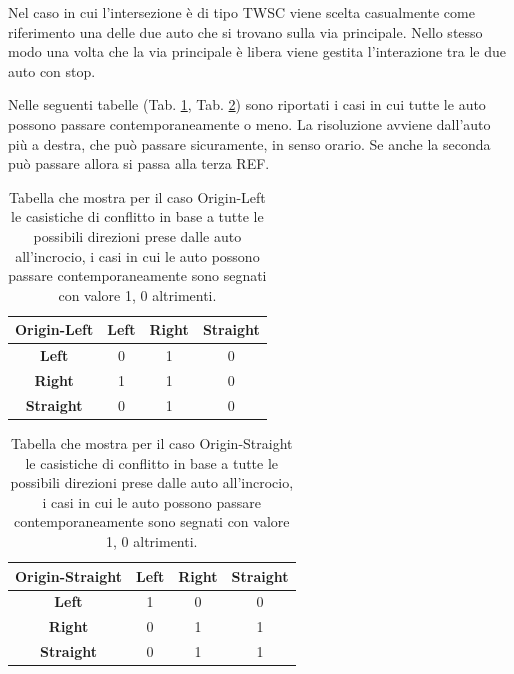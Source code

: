 Nel caso in cui l'intersezione è di tipo TWSC viene scelta casualmente come riferimento una delle due auto che si trovano 
sulla via principale. Nello stesso modo una volta che la via principale è libera viene gestita l'interazione tra le due auto con stop.

Nelle seguenti tabelle (Tab. \ref{tab:Origin-Left}, Tab. \ref{Origin-Straight}) sono riportati i casi in cui tutte le auto possono passare contemporaneamente o meno.
La risoluzione avviene dall'auto più a destra, che può passare sicuramente, in senso orario. 
Se anche la seconda può passare allora si passa alla terza REF.

\begin{table}[ht]
    \centering
    \begin{tabular}{|c|c|c|c|}
        \hline
        \textbf{Origin-Left} & \textbf{Left} & \textbf{Right} & \textbf{Straight} \\ \hline
        \textbf{Left}        & 0             & 1              & 0                 \\ \hline
        \textbf{Right}       & 1             & 1              & 0                 \\ \hline
        \textbf{Straight}    & 0             & 1              & 0                 \\ \hline
    \end{tabular}
    \caption{Tabella che mostra per il caso Origin-Left le casistiche di conflitto in base a tutte le possibili direzioni prese dalle auto all'incrocio, i casi in cui le auto possono passare contemporaneamente sono segnati con valore 1, 0 altrimenti.
    }
    \label{tab:Origin-Left}
\end{table}


\begin{table}[ht]
    \centering
    \begin{tabular}{|c|c|c|c|}
        \hline
        \textbf{Origin-Straight} & \textbf{Left} & \textbf{Right} & \textbf{Straight} \\ \hline
        \textbf{Left}            & 1             & 0              & 0                 \\ \hline
        \textbf{Right}           & 0             & 1              & 1                 \\ \hline
        \textbf{Straight}        & 0             & 1              & 1                 \\ \hline
    \end{tabular}
    \caption{Tabella che mostra per il caso Origin-Straight le casistiche di conflitto in base a tutte le possibili direzioni prese dalle auto all'incrocio, i casi in cui le auto possono passare contemporaneamente sono segnati con valore 1, 0 altrimenti.}
    \label{Origin-Straight}
\end{table}


